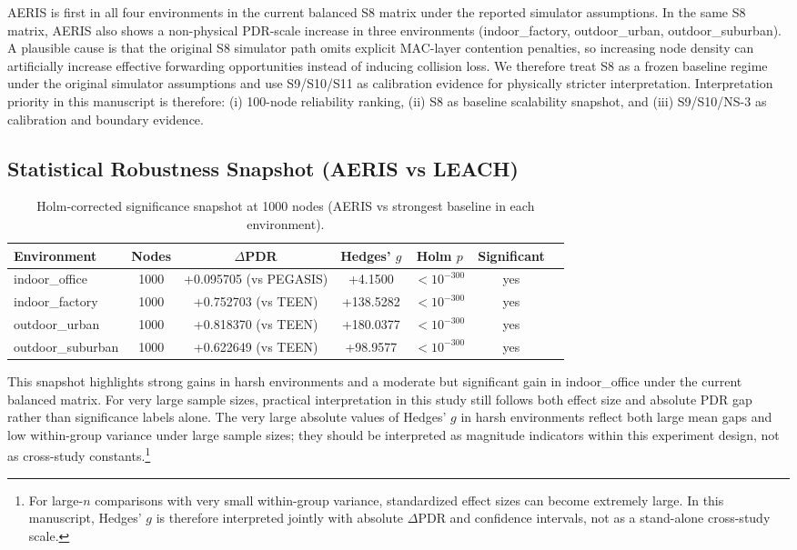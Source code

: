 ﻿\documentclass[sensors,article,submit,moreauthors,pdftex]{Definitions/mdpi}
\begin{document}
AERIS is first in all four environments in the current balanced S8 matrix under the reported simulator assumptions.
In the same S8 matrix, AERIS also shows a non-physical PDR-scale increase in three environments (indoor\_factory, outdoor\_urban, outdoor\_suburban). A plausible cause is that the original S8 simulator path omits explicit MAC-layer contention penalties, so increasing node density can artificially increase effective forwarding opportunities instead of inducing collision loss. We therefore treat S8 as a frozen baseline regime under the original simulator assumptions and use S9/S10/S11 as calibration evidence for physically stricter interpretation.
Interpretation priority in this manuscript is therefore: (i) 100-node reliability ranking, (ii) S8 as baseline scalability snapshot, and (iii) S9/S10/NS-3 as calibration and boundary evidence.

\subsection{Statistical Robustness Snapshot (AERIS vs LEACH)}
\begin{table}[H]
\caption{Holm-corrected significance snapshot at 1000 nodes (AERIS vs strongest baseline in each environment).}
\label{tab:robust_snapshot}
\centering
\begin{tabular}{lcccccc}
\toprule
Environment & Nodes & $\Delta$PDR & Hedges' $g$ & Holm $p$ & Significant \\
\midrule
indoor\_office    & 1000 & +0.095705 (vs PEGASIS) & +4.1500 & $<10^{-300}$ & yes \\
indoor\_factory   & 1000 & +0.752703 (vs TEEN) & +138.5282 & $<10^{-300}$ & yes \\
outdoor\_urban    & 1000 & +0.818370 (vs TEEN) & +180.0377 & $<10^{-300}$ & yes \\
outdoor\_suburban & 1000 & +0.622649 (vs TEEN) & +98.9577 & $<10^{-300}$ & yes \\
\bottomrule
\end{tabular}
\end{table}

This snapshot highlights strong gains in harsh environments and a moderate but significant gain in indoor\_office under the current balanced matrix.
For very large sample sizes, practical interpretation in this study still follows both effect size and absolute PDR gap rather than significance labels alone.
The very large absolute values of Hedges' $g$ in harsh environments reflect both large mean gaps and low within-group variance under large sample sizes; they should be interpreted as magnitude indicators within this experiment design, not as cross-study constants.\footnote{For large-\(n\) comparisons with very small within-group variance, standardized effect sizes can become extremely large. In this manuscript, Hedges' \(g\) is therefore interpreted jointly with absolute \(\Delta\)PDR and confidence intervals, not as a stand-alone cross-study scale.}
\end{document}
